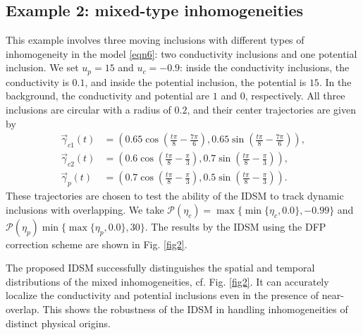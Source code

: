 \documentclass[onefignum,onetabnum]{siamart190516}
\numberwithin{equation}{section}
\begin{document}
\subsection{Example 2: mixed-type inhomogeneities}\label{exam:2}
This example involves three moving inclusions with different types of inhomogeneity in the model \eqref{eqn6}: two conductivity inclusions and one potential inclusion.
We set $u_p = 15$ and $u_c = -0.9$: inside the conductivity inclusions, the conductivity is $0.1$, and inside the potential inclusion, the potential is $15$.
In the background, the conductivity and potential are $1$ and $0$, respectively. All three inclusions are circular with a radius of $0.2$, and their center trajectories are given by
\begin{align*}
\vec{\gamma}_{c1}(t) &= \left(0.65\cos\left(\tfrac{t\pi}{8} - \tfrac{7\pi}{6}\right), 0.65\sin\left(\tfrac{t\pi}{8} - \tfrac{7\pi}{6}\right)\right), \\
\vec{\gamma}_{c2}(t) &= \left(0.6\cos\left(\tfrac{t\pi}{8} - \tfrac{\pi}{3}\right), 0.7\sin\left(\tfrac{t\pi}{8} - \tfrac{\pi}{3}\right)\right), \\
\vec{\gamma}_{p}(t) &= \left(0.7\cos\left(\tfrac{t\pi}{8} - \tfrac{\pi}{3}\right), 0.5\sin\left(\tfrac{t\pi}{8} - \tfrac{\pi}{3}\right)\right).
\end{align*}
These trajectories are chosen to test the ability of the IDSM to track dynamic inclusions with overlapping.
We take
$\mathcal{P}(\eta_c)=\max\{\min\{\eta_{c},0.0\},-0.99\}$ and $\mathcal{P}(\eta_{p})
\min\{\max\{\eta_{p},0.0\},30\}$. The results by the IDSM using the DFP correction scheme are shown in Fig. \ref{fig2}.

The proposed IDSM successfully distinguishes the spatial and temporal distributions of the mixed inhomogeneities, cf. Fig. \ref{fig2}.
It can accurately localize the conductivity and potential inclusions even in the presence of near-overlap.
This shows the robustness of the IDSM in handling inhomogeneities of distinct physical origins.
\end{document}
